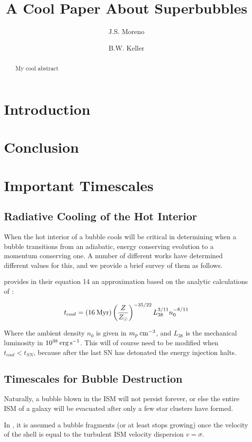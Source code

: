 \documentclass[linenumbers,twocolappendix,twocolumn]{aastex631}
\begin{document}
\title{A Cool Paper About Superbubbles}

\author{J.S. Moreno}
\author[0000-0002-9642-7193]{B.W. Keller}

\begin{abstract} 
    My cool abstract
\end{abstract}


\section{Introduction}
\section{Conclusion}




\appendix
\section{Important Timescales}
\subsection{Radiative Cooling of the Hot Interior}
When the hot interior of a bubble cools will be critical in determining when a
bubble transitions from an adiabatic, energy conserving evolution to a momentum
conserving one.  A number of different works have determined different values
for this, and we provide a brief survey of them as follows.

\citet{MacLow1988} provides in their equation 14 an approximation based on the
analytic calculations of \citet{Weaver1977}:

\begin{equation}
    t_{cool} =
    (16\Myr)\left(\frac{Z}{Z_\odot}\right)^{-35/22}L_{38}^{3/11}n_0^{-8/11}
\end{equation}

Where the ambient density $n_0$ is given in $m_p \>{\rm cm^{-3}}$, and $L_{38}$ is the
mechanical luminosity in $10^{38}\>{\rm erg}\, {\rm s}^{-1}$.  This will of course need to be
modified when $t_{cool}<t_{SN}$, because after the last SN has detonated the
energy injection halts.

\subsection{Timescales for Bubble Destruction}
Naturally, a bubble blown in the ISM will not persist forever, or else the
entire ISM of a galaxy will be evacuated after only a few star clusters have
formed. 

In \citep{Orr2022}, it is assumed a bubble fragments (or at least stops growing)
once the velocity of the shell is equal to the turbulent ISM velocity dispersion
$v=\sigma$.
\end{document}
